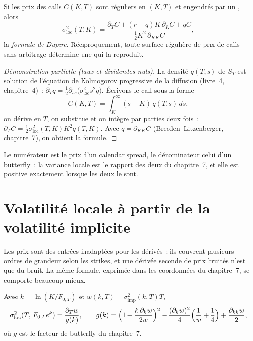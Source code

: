 \begin{theorem}\label{thm:dv:local-volatility:dupire}
Si les prix des calls $C(K,T)$ sont réguliers en $(K,T)$ et engendrés par un , alors
\[
\sigma_{\mathrm{loc}}^2(T,K)=\frac{\partial_TC+(r-q)K\,\partial_KC+qC}{\tfrac12K^2\,\partial_{KK}C},
\]
la \emph{formule de Dupire}. Réciproquement, toute surface régulière de prix de calls
sans arbitrage détermine une  qui la reproduit.
\end{theorem}
\begin{proof}[Démonstration partielle (taux et dividendes nuls)]
La densité $q(T,s)$ de $S_T$ est solution de l'équation de Kolmogorov progressive de la diffusion (livre~4,
chapitre~4)~: $\partial_Tq=\tfrac12\partial_{ss}\bigl(\sigma_{\mathrm{loc}}^2s^2q\bigr)$.
Écrivons le call sous la forme
\[
C(K,T)=\int_K^\infty(s-K)\,q(T,s)\,ds,
\]
on dérive en $T$, on substitue et on intègre par parties deux fois~:
$\partial_TC=\tfrac12\sigma_{\mathrm{loc}}^2(T,K)K^2q(T,K)$. Avec $q=\partial_{KK}C$
(Breeden--Litzenberger, chapitre~7), on obtient la formule.
\end{proof}

Le numérateur est le prix d'un calendar spread, le dénominateur celui d'un butterfly~: la variance locale est
le rapport des deux  du chapitre~7, et elle est positive exactement lorsque les deux le sont.

\section{Volatilité locale à partir de la volatilité implicite}

Les prix sont des entrées inadaptées pour les dérivés~: ils couvrent plusieurs ordres de grandeur selon les strikes, et une
dérivée seconde de prix bruités n'est que du bruit. La même formule, exprimée dans les coordonnées du chapitre~7,
se comporte beaucoup mieux.

\begin{proposition}\label{prop:dv:local-volatility:w}
Avec $k=\ln(K/F_{0,T})$ et $w(k,T)=\sigma_{\mathrm{imp}}^2(k,T)T$,
\[
\sigma_{\mathrm{loc}}^2(T,\,F_{0,T}e^k)=\frac{\partial_Tw}{g(k)},\qquad
g(k)=\Bigl(1-\frac{k\,\partial_kw}{2w}\Bigr)^2-\frac{(\partial_kw)^2}{4}\Bigl(\frac1w+\frac14\Bigr)
+\frac{\partial_{kk}w}2 ,
\]
où $g$ est le facteur de butterfly du chapitre~7.
\end{proposition}
\admitted

